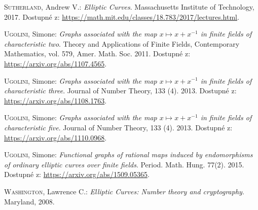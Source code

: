 \documentclass[12pt]{report}
\begin{document}
\begin{thebibliography}{97}
\textsc{Sutherland}, Andrew V.: \textit{Elliptic Curves}. Massachusetts Institute of Technology, 2017. Dostupné z: \url{https://math.mit.edu/classes/18.783/2017/lectures.html}. 


\textsc{Ugolini}, Simone: \textit{Graphs associated with the map $x\mapsto x+x^{-1}$ in finite fields of characteristic two}. Theory and Applications of Finite Fields, Contemporary Mathematics, vol. 579, Amer. Math. Soc. 2011. Dostupné z: \url{https://arxiv.org/abs/1107.4565}.


\textsc{Ugolini}, Simone: \textit{Graphs associated with the map $x\mapsto x+x^{-1}$ in finite fields of characteristic three}. Journal of Number Theory, 133 (4). 2013. Dostupné z: \url{https://arxiv.org/abs/1108.1763}.

\textsc{Ugolini}, Simone: \textit{Graphs associated with the map $x\mapsto x+x^{-1}$ in finite fields of characteristic five}. Journal of Number Theory, 133 (4). 2013. Dostupné z: \url{https://arxiv.org/abs/1110.0968}.

\textsc{Ugolini}, Simone: \textit{Functional graphs of rational maps induced by endomorphisms of ordinary elliptic curves over finite fields}. Period. Math. Hung. 77(2). 2015. Dostupné z: \url{https://arxiv.org/abs/1509.05365}.

\textsc{Washington}, Lawrence C.: \textit{Elliptic Curves: Number theory and cryptography}. Maryland, 2008. 



\end{thebibliography}
\end{document}
